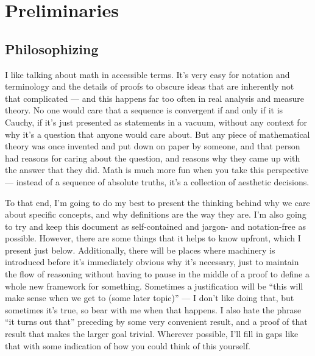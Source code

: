 \documentclass[./analysis.tex]{subfiles}
\begin{document}
\section{Preliminaries}

\subsection{Philosophizing}

I like talking about math in accessible terms. It's very easy for notation and terminology and the details of proofs to obscure ideas that are inherently not that complicated --- and this happens far too often in real analysis and measure theory. No one would care that a sequence is convergent if and only if it is Cauchy, if it's just presented as statements in a vacuum, without any context for why it's a question that anyone would care about. But any piece of mathematical theory was once invented and put down on paper by someone, and that person had reasons for caring about the question, and reasons why they came up with the answer that they did. Math is much more fun when you take this perspective --- instead of a sequence of absolute truths, it's a collection of aesthetic decisions. 

To that end, I'm going to do my best to present the thinking behind why we care about specific concepts, and why definitions are the way they are. I'm also going to try and keep this document as self-contained and jargon- and notation-free as possible. However, there are some things that it helps to know upfront, which I present just below. Additionally, there will be places where machinery is introduced before it's immediately obvious why it's necessary, just to maintain the flow of reasoning without having to pause in the middle of a proof to define a whole new framework for something. Sometimes a justification will be ``this will make sense when we get to (some later topic)'' --- I don't like doing that, but sometimes it's true, so bear with me when that happens. I also hate the phrase ``it turns out that'' preceding by some very convenient result, and a proof of that result that makes the larger goal trivial. Wherever possible, I'll fill in gaps like that with some indication of how you could think of this yourself.
\end{document}
